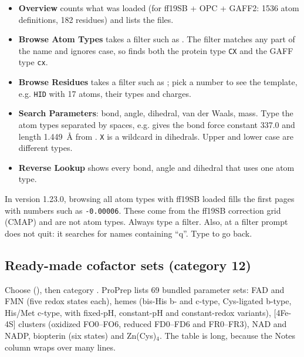 \begin{itemize}
  \item \textbf{Overview} counts what was loaded (for ff19SB + OPC + GAFF2:
        1536 atom definitions, 182 residues) and lists the files.
  \item \textbf{Browse Atom Types} takes a filter such as . The
        filter matches any part of the name and ignores case, so 
        finds both the protein type \texttt{CX} and the GAFF type
        \texttt{cx}.
  \item \textbf{Browse Residues} takes a filter such as ; pick a
        number to see the template, e.g. \texttt{HID} with 17 atoms, their
        types and charges.
  \item \textbf{Search Parameters}:  bond,  angle, 
        dihedral,  van der Waals,  mass. Type the atom types
        separated by spaces, e.g.  gives the bond force constant
        337.0 and length 1.449~\AA{} from . \texttt{X} is a
        wildcard in dihedrals. Upper and lower case are different types.
  \item \textbf{Reverse Lookup} shows every bond, angle and dihedral that
        uses one atom type.
\end{itemize}

\begin{watchout}
In version 1.23.0, browsing all atom types with ff19SB loaded fills the first
pages with numbers such as \texttt{-0.00006}. These come from the ff19SB
correction grid (CMAP) and are not atom types. Always type a filter. Also,
at a filter prompt  does not quit: it searches for names containing
``q''. Type  to go back.
\end{watchout}

\subsection{Ready-made cofactor sets (category 12)}
\label{sec:forcefields-cofactors}

Choose  (), then category
. ProPrep lists 69 bundled parameter sets: FAD and FMN (five redox
states each), hemes (bis-His b- and c-type, Cys-ligated b-type, His/Met
c-type, with fixed-pH, constant-pH and constant-redox variants), [4Fe-4S]
clusters (oxidized FO0--FO6, reduced FD0--FD6 and FR0--FR3), NAD and NADP,
biopterin (six states) and Zn(Cys)$_4$. The table is long, because the Notes
column wraps over many lines.

